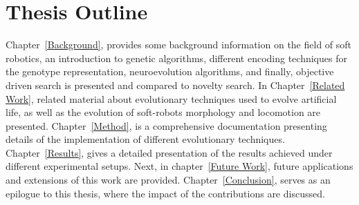 \section{Thesis Outline}

Chapter~\ref{Background}, provides some background information on the field of soft robotics, an introduction to genetic algorithms, different encoding techniques for the genotype representation, neuroevolution algorithms, and finally, objective driven search is presented and compared to novelty search. In Chapter~\ref{Related Work}, related material about evolutionary techniques used to evolve artificial life, as well as the evolution of soft-robots morphology and locomotion are presented. Chapter~\ref{Method}, is a comprehensive documentation presenting details of the implementation of different evolutionary techniques. Chapter~\ref{Results}, gives a detailed presentation of the results achieved under different experimental setups. Next, in chapter~\ref{Future Work}, future applications and extensions of this work are provided. Chapter~\ref{Conclusion}, serves as an epilogue to this thesis, where the impact of the contributions are discussed.






